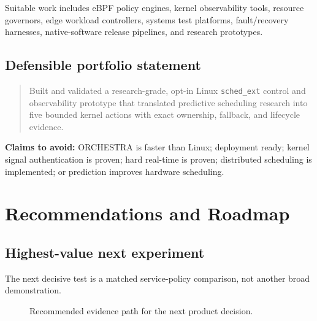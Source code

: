 \documentclass[11pt,a4paper,oneside]{report}
\newcommand{\schedext}{\texttt{sched\_ext}}
\begin{document}
Suitable work includes eBPF policy engines, kernel observability tools, resource
governors, edge workload controllers, systems test platforms, fault/recovery
harnesses, native-software release pipelines, and research prototypes.

\section{Defensible portfolio statement}

\begin{quote}
Built and validated a research-grade, opt-in Linux \schedext{} control and
observability prototype that translated predictive scheduling research into
five bounded kernel actions with exact ownership, fallback, and lifecycle
evidence.
\end{quote}

\textbf{Claims to avoid:} ORCHESTRA is faster than Linux; deployment ready;
kernel signal authentication is proven; hard real-time is proven; distributed
scheduling is implemented; or prediction improves hardware scheduling.

\chapter{Recommendations and Roadmap}

\section{Highest-value next experiment}

The next decisive test is a matched service-policy comparison, not another
broad demonstration.

\begin{figure}[H]
\centering
{}
\caption{Recommended evidence path for the next product decision.}
\label{fig:roadmap}
\end{figure}
\end{document}
